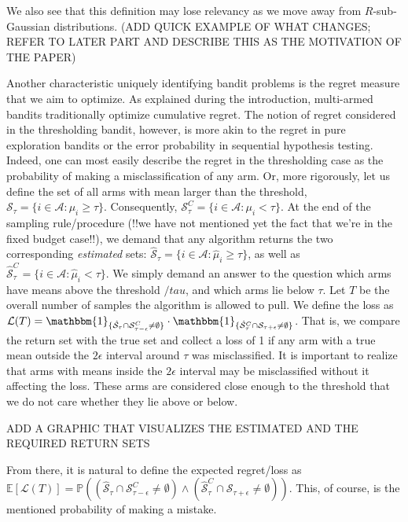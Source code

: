 \documentclass[12pt,]{article}
\begin{document}
We also see that this definition may lose relevancy as we move away from
\(R\)-sub-Gaussian distributions. (ADD QUICK EXAMPLE OF WHAT CHANGES;
REFER TO LATER PART AND DESCRIBE THIS AS THE MOTIVATION OF THE PAPER)

Another characteristic uniquely identifying bandit problems is the
regret measure that we aim to optimize. As explained during the
introduction, multi-armed bandits traditionally optimize cumulative
regret. The notion of regret considered in the thresholding bandit,
however, is more akin to the regret in pure exploration bandits or the
error probability in sequential hypothesis testing. Indeed, one can most
easily describe the regret in the thresholding case as the probability
of making a misclassification of any arm. Or, more rigorously, let us
define the set of all arms with mean larger than the threshold,
\(\mathcal{S}_\tau = \{i \in \mathcal{A}: \mu_i \geq \tau\}\).
Consequently,
\(\mathcal{S}_\tau^C = \{i \in \mathcal{A}: \mu_i < \tau\}\). At the end
of the sampling rule/procedure (!!we have not mentioned yet the fact
that we're in the fixed budget case!!), we demand that any algorithm
returns the two corresponding \emph{estimated} sets:
\(\hat{\mathcal{S}}_{\tau} = \{i \in \mathcal{A}: \hat{\mu}_i \geq \tau\}\),
as well as
\(\hat{\mathcal{S}}_{\tau}^C = \{i \in \mathcal{A}: \hat{\mu}_i < \tau\}\).
We simply demand an answer to the question which arms have means above
the threshold \(/tau\), and which arms lie below \(\tau\). Let \(T\) be
the overall number of samples the algorithm is allowed to pull. We
define the loss as
\(\mathcal{L}(T) = \mathbbm{1}_{\{\hat{\mathcal{S}}_{\tau} \cap \mathcal{S}_{\tau-\epsilon}^C \neq \emptyset\}} \cdot \mathbbm{1}_{\{\hat{\mathcal{S}}_{\tau}^C \cap \mathcal{S}_{\tau+\epsilon} \neq \emptyset\}}\).
That is, we compare the return set with the true set and collect a loss
of 1 if any arm with a true mean outside the \(2\epsilon\) interval
around \(\tau\) was misclassified. It is important to realize that arms
with means inside the \(2 \epsilon\) interval may be misclassified
without it affecting the loss. These arms are considered close enough to
the threshold that we do not care whether they lie above or below.

ADD A GRAPHIC THAT VISUALIZES THE ESTIMATED AND THE REQUIRED RETURN SETS

From there, it is natural to define the expected regret/loss as
\(\mathbb{E}[\mathcal{L}(T)] = \mathbb{P}((\hat{\mathcal{S}}_{\tau} \cap \mathcal{S}_{\tau-\epsilon}^C \neq \emptyset) \land (\hat{\mathcal{S}}_{\tau}^C \cap \mathcal{S}_{\tau+\epsilon} \neq \emptyset))\).
This, of course, is the mentioned probability of making a mistake.
\end{document}
